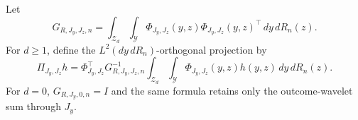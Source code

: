 Let
\[
G_{R,J_y,J_z,n}=\int_{\mathcal Z_d}\int_{\mathcal Y}
\Phi_{J_y,J_z}(y,z)\Phi_{J_y,J_z}(y,z)^{\top}\,dy\,dR_n(z).
\]
For \(d\ge1\), define the \(L^2(dy\,dR_n)\)-orthogonal projection by
\[
\Pi_{J_y,J_z}h
=\Phi_{J_y,J_z}^{\top}G_{R,J_y,J_z,n}^{-1}
\int_{\mathcal Z_d}\int_{\mathcal Y}\Phi_{J_y,J_z}(y,z)h(y,z)\,dy\,dR_n(z).
\]
For \(d=0\), \(G_{R,J_y,0,n}=I\) and the same formula retains only the outcome-wavelet sum through \(J_y\).
